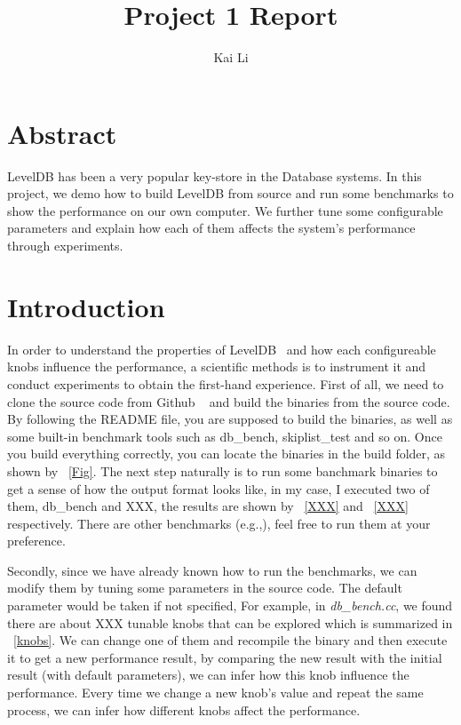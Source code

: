 \documentclass[letter,twocolumn,10pt]{article}
\begin{document}
\date{}

\title{\Large \textbf{Project 1 Report}}
\author{Kai Li}
\maketitle

\section*{Abstract}
LevelDB has been a very popular key-store in the Database systems. In this project, we demo how to build LevelDB from source and run some benchmarks to show the performance on our own computer. We further tune some configurable parameters and explain how each of them affects the system's performance through experiments.
\section{Introduction}
In order to understand the properties of LevelDB~\cite{leveldb} and how each configureable knobs influence the performance, a scientific methods is to instrument it and conduct experiments to obtain the first-hand experience. First of all, we need to clone the source code from Github ~\cite{XXX} and build the binaries from the source code. By following the README file, you are supposed to build the binaries, as well as some built-in benchmark tools such as \textsf{db\_bench}, \textsf{skiplist\_test} and so on. Once you build everything correctly, you can locate the binaries in the build folder, as shown by ~\ref{Fig}. The next step naturally is to run some banchmark binaries to get a sense of how the output format looks like, in my case, I executed two of them, db_bench and XXX, the results are shown by ~\ref{XXX} and ~\ref{XXX} respectively. There are other benchmarks (e.g.,), feel free to run them at your preference. 

Secondly, since we have already known how to run the benchmarks, we can modify them by tuning some parameters in the source code. The default parameter would be taken if not specified, For example, in \textit{db\_bench.cc}, we found there are about XXX tunable knobs that can be explored which is summarized in ~\ref{knobs}. We can change one of them and recompile the binary and then execute it to get a new performance result, by comparing the new result with the initial result (with default parameters), we can infer how this knob influence the performance. Every time we change a new knob's value and repeat the same process, we can infer how different knobs affect the performance.
\end{document}
